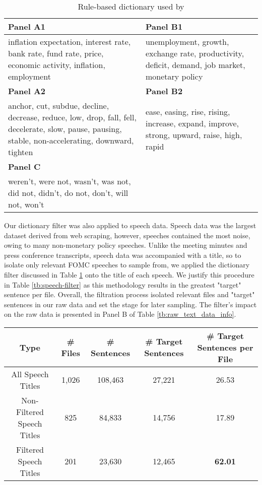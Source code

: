 \documentclass[11pt]{article}
\begin{document}
\begin{table}[ht]
\centering
\footnotesize
\begin{tabular}{p{}|p{}}
\hline
\textbf{Panel A1} & \textbf{Panel B1}\\
\hline
inflation expectation, interest rate, bank rate, fund rate, price, economic activity, inflation, employment
& 
unemployment, growth, exchange rate, productivity, deficit, demand, job market, monetary policy\\
\hline
\textbf{Panel A2} & \textbf{Panel B2}\\
\hline
anchor, cut, subdue, decline, decrease, reduce, low, drop, fall, fell, decelerate, slow, pause, pausing, stable, non-accelerating, downward, tighten & 
ease, easing, rise, rising, increase, expand, improve, strong, upward, raise, high, rapid \\
\hline
\textbf{Panel C} \\
\hline
weren't, were not, wasn't, was not, did not, didn't, do not, don't, will not, won't \\
\hline

\end{tabular}
\caption{Rule-based dictionary used by \citeauthor{gorodnichenko2021voice}}
\label{tb:rule-based}
\end{table}

Our dictionary filter was also applied to speech data. Speech data was the largest dataset derived from web scraping, however, speeches contained the most noise, owing to many non-monetary policy speeches.
Unlike the meeting minutes and press conference transcripts, speech data was accompanied with a title, so to isolate only relevant FOMC speeches to sample from, we applied the dictionary filter discussed in Table \ref{tb:rule-based} onto the title of each speech. We justify this procedure in Table \ref{tb:speech-filter} as this methodology results in the greatest "target" sentence per file. Overall, the filtration process isolated relevant files and "target" sentences in our raw data and set the stage for later sampling. The filter's impact on the raw data is presented in Panel B of Table \ref{tb:raw_text_data_info}.



\begin{table*}
\centering
\footnotesize
\begin{tabular}{ccccc}
\hline
\textbf{Type} & \textbf{\# Files} &\textbf{\# Sentences} & \textbf{\# Target Sentences} & \textbf{\# Target Sentences per File} \\
\hline
All Speech Titles & 1,026 & 108,463 & 27,221 & 26.53\\
Non-Filtered Speech Titles & 825 & 84,833 & 14,756 & 17.89 \\
Filtered Speech Titles & 201 & 23,630 & 12,465 & \textbf{62.01}\\
\hline 
\end{tabular}
\caption{Details on the speech title filter methodology}
\label{tb:speech-filter}
\end{table*}
\end{document}
